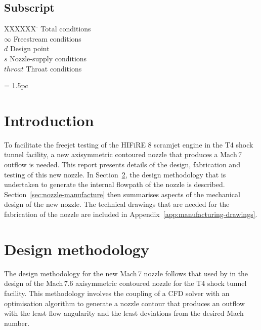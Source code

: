 \documentclass[12pt,a4paper]{article}
\begin{document}
\subsection*{Subscript}
\begin{multicols}{2}
 \begin{tabbing}
  XXXXXX \=           \> Total conditions         \\
  $\infty$   \> Freestream conditions    \\
  $d$        \> Design point             \\
  $s$        \> Nozzle-supply conditions \\
  $throat$   \> Throat conditions        \\
 \end{tabbing}
\end{multicols}


\newpage
\baselineskip = 1.5pc


\section{Introduction}
\label{sec:intro}
%
To facilitate the freejet testing of the HIFiRE 8 scramjet engine in the T4 shock 
tunnel facility, a new axisymmetric contoured nozzle that produces a Mach\,7 
outflow is needed. This report presents details of the design, fabrication and
testing of this new nozzle. In Section~\ref{sec:nozzle-design}, the design 
methodology that is undertaken to generate the internal flowpath of the nozzle is 
described. Section~\ref{sec:nozzle-manufacture} then summarises aspects of the 
mechanical design of the new nozzle. The technical drawings that are needed for 
the fabrication of the nozzle are included in Appendix~\ref{app:manufacturing-drawings}. 
%


\section{Design methodology}
\label{sec:nozzle-design}
%
The design methodology for the new Mach\,7 nozzle follows that used by  
 in the design of the Mach\,7.6 axisymmetric contoured 
nozzle for the T4 shock tunnel facility. This methodology involves the coupling 
of a CFD solver with an optimisation algorithm to generate a nozzle contour that
produces an outflow with the least flow angularity and the least deviations from
the desired Mach number. 
\end{document}
